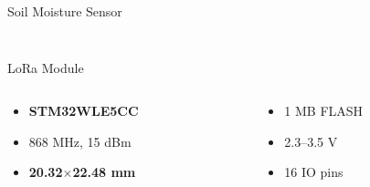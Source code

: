 \documentclass{beamer}
\begin{document}
\begin{frame}{Soil Moisture Sensor}
\begin{columns}[T]
\begin{column}{.5\textwidth}
\begin{figure}
    \end{figure}
\end{column}
\end{columns}
\end{frame}


\begin{frame}{LoRa Module}
\begin{figure}
    \centering
    \small
    
\end{figure}
\begin{columns}[T]
\begin{column}{.5\textwidth}
    \begin{itemize}
        \item \textbf{STM32WLE5CC}
        \item 868 MHz, 15 dBm
        \item \textbf{20.32}$\mathbf{\times}$\textbf{22.48 mm}
    \end{itemize}
\end{column}
\hfill
\begin{column}{.5\textwidth}
    \begin{itemize}
        \item 1 MB FLASH
        \item 2.3--3.5 V
        \item 16 IO pins
    \end{itemize}
\end{column}
\end{columns}
\end{frame}
\end{document}
